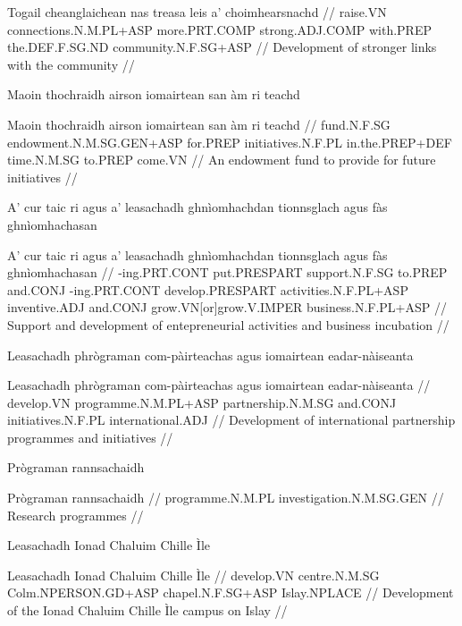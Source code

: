 \documentclass[a4paper,10pt]{article}
\begin{document}
\vspace{4mm}
\gla Togail cheanglaichean nas treasa leis a' choimhearsnachd  //
\glb raise.VN connections.N.M.PL+ASP more.PRT.COMP strong.ADJ.COMP with.PREP the.DEF.F.SG.ND community.N.F.SG+ASP  //
\glft Development of stronger links with the community //
\endgl
\xe

\ex
\begingl
\glpre Maoin thochraidh airson iomairtean san àm ri teachd 

\vspace{4mm}
\gla Maoin thochraidh airson iomairtean san àm ri teachd  //
\glb fund.N.F.SG endowment.N.M.SG.GEN+ASP for.PREP initiatives.N.F.PL in.the.PREP+DEF time.N.M.SG to.PREP come.VN  //
\glft An endowment fund to provide for future initiatives //
\endgl
\xe

\ex
\begingl
\glpre A' cur taic ri agus a' leasachadh ghnìomhachdan tionnsglach agus fàs ghnìomhachasan 

\vspace{4mm}
\gla A' cur taic ri agus a' leasachadh ghnìomhachdan tionnsglach agus fàs ghnìomhachasan  //
\glb -ing.PRT.CONT put.PRESPART support.N.F.SG to.PREP and.CONJ -ing.PRT.CONT develop.PRESPART activities.N.F.PL+ASP inventive.ADJ and.CONJ grow.VN[or]grow.V.IMPER business.N.F.PL+ASP  //
\glft Support and development of entepreneurial activities and business incubation //
\endgl
\xe

\ex
\begingl
\glpre Leasachadh phrògraman com-pàirteachas agus iomairtean eadar-nàiseanta 

\vspace{4mm}
\gla Leasachadh phrògraman com-pàirteachas agus iomairtean eadar-nàiseanta  //
\glb develop.VN programme.N.M.PL+ASP partnership.N.M.SG and.CONJ initiatives.N.F.PL international.ADJ  //
\glft Development of international partnership programmes and initiatives //
\endgl
\xe

\ex
\begingl
\glpre Prògraman rannsachaidh 

\vspace{4mm}
\gla Prògraman rannsachaidh  //
\glb programme.N.M.PL investigation.N.M.SG.GEN  //
\glft Research programmes //
\endgl
\xe

\ex
\begingl
\glpre Leasachadh Ionad Chaluim Chille Ìle 

\vspace{4mm}
\gla Leasachadh Ionad Chaluim Chille Ìle  //
\glb develop.VN centre.N.M.SG Colm.NPERSON.GD+ASP chapel.N.F.SG+ASP Islay.NPLACE  //
\glft Development of the Ionad Chaluim Chille Ìle campus on Islay //
\endgl
\xe
\end{document}
